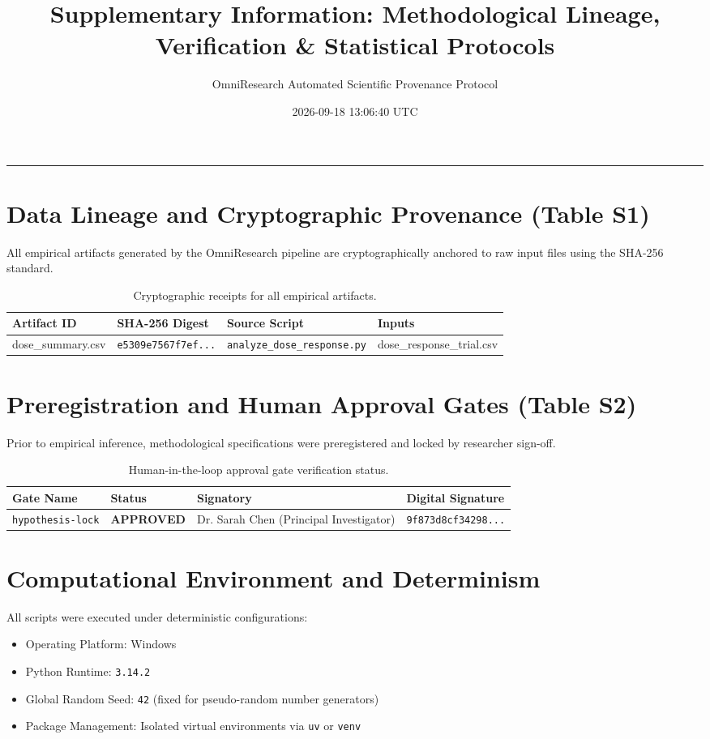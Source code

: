 \documentclass[11pt,a4paper]{article}
\title{\textbf{Supplementary Information: Methodological Lineage, Verification \& Statistical Protocols}}
\author{\small OmniResearch Automated Scientific Provenance Protocol}
\date{\small 2026-09-18 13:06:40 UTC}
\begin{document}
\maketitle
\tableofcontents
\vspace{1em}\hrule\vspace{1em}

\section{Data Lineage and Cryptographic Provenance (Table S1)}
All empirical artifacts generated by the OmniResearch pipeline are cryptographically anchored to raw input files using the SHA-256 standard.
\vspace{0.5em}
\begin{table}[htbp]
\centering
\small
\begin{tabular}{llll}
\toprule
\textbf{Artifact ID} & \textbf{SHA-256 Digest} & \textbf{Source Script} & \textbf{Inputs} \\
\midrule
dose\_summary.csv & \texttt{e5309e7567f7ef...} & \texttt{analyze\_dose\_response.py} & dose\_response\_trial.csv \\
\bottomrule
\end{tabular}
\caption{Cryptographic receipts for all empirical artifacts.}
\label{tab:s1_provenance}
\end{table}

\section{Preregistration and Human Approval Gates (Table S2)}
Prior to empirical inference, methodological specifications were preregistered and locked by researcher sign-off.
\vspace{0.5em}
\begin{table}[htbp]
\centering
\small
\begin{tabular}{llll}
\toprule
\textbf{Gate Name} & \textbf{Status} & \textbf{Signatory} & \textbf{Digital Signature} \\
\midrule
\texttt{hypothesis-lock} & \textbf{APPROVED} & Dr. Sarah Chen (Principal Investigator) & \texttt{9f873d8cf34298...} \\
\bottomrule
\end{tabular}
\caption{Human-in-the-loop approval gate verification status.}
\label{tab:s2_gates}
\end{table}

\section{Computational Environment and Determinism}
All scripts were executed under deterministic configurations:
\begin{itemize}
\item Operating Platform: Windows
\item Python Runtime: \texttt{3.14.2}
\item Global Random Seed: \texttt{42} (fixed for pseudo-random number generators)
\item Package Management: Isolated virtual environments via \texttt{uv} or \texttt{venv}
\end{itemize}
\end{document}
